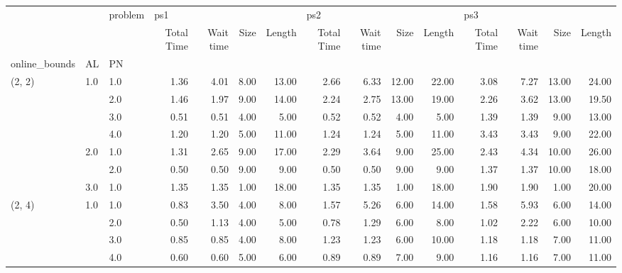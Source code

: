\begin{tabular}{lllrrrrrrrrrrrr}
\toprule
       &     & problem & \multicolumn{4}{l}{ps1} & \multicolumn{4}{l}{ps2} & \multicolumn{4}{l}{ps3} \\
       &     & {} & Total Time & Wait time & Size & Length & Total Time & Wait time &  Size & Length & Total Time & Wait time &  Size & Length \\
online\_bounds & AL & PN &            &           &      &        &            &           &       &        &            &           &       &        \\
\midrule
(2, 2) & 1.0 & 1.0  &       1.36 &      4.01 & 8.00 &  13.00 &       2.66 &      6.33 & 12.00 &  22.00 &       3.08 &      7.27 & 13.00 &  24.00 \\
       &     & 2.0  &       1.46 &      1.97 & 9.00 &  14.00 &       2.24 &      2.75 & 13.00 &  19.00 &       2.26 &      3.62 & 13.00 &  19.50 \\
       &     & 3.0  &       0.51 &      0.51 & 4.00 &   5.00 &       0.52 &      0.52 &  4.00 &   5.00 &       1.39 &      1.39 &  9.00 &  13.00 \\
       &     & 4.0  &       1.20 &      1.20 & 5.00 &  11.00 &       1.24 &      1.24 &  5.00 &  11.00 &       3.43 &      3.43 &  9.00 &  22.00 \\
       & 2.0 & 1.0  &       1.31 &      2.65 & 9.00 &  17.00 &       2.29 &      3.64 &  9.00 &  25.00 &       2.43 &      4.34 & 10.00 &  26.00 \\
       &     & 2.0  &       0.50 &      0.50 & 9.00 &   9.00 &       0.50 &      0.50 &  9.00 &   9.00 &       1.37 &      1.37 & 10.00 &  18.00 \\
       & 3.0 & 1.0  &       1.35 &      1.35 & 1.00 &  18.00 &       1.35 &      1.35 &  1.00 &  18.00 &       1.90 &      1.90 &  1.00 &  20.00 \\
(2, 4) & 1.0 & 1.0  &       0.83 &      3.50 & 4.00 &   8.00 &       1.57 &      5.26 &  6.00 &  14.00 &       1.58 &      5.93 &  6.00 &  14.00 \\
       &     & 2.0  &       0.50 &      1.13 & 4.00 &   5.00 &       0.78 &      1.29 &  6.00 &   8.00 &       1.02 &      2.22 &  6.00 &  10.00 \\
       &     & 3.0  &       0.85 &      0.85 & 4.00 &   8.00 &       1.23 &      1.23 &  6.00 &  10.00 &       1.18 &      1.18 &  7.00 &  11.00 \\
       &     & 4.0  &       0.60 &      0.60 & 5.00 &   6.00 &       0.89 &      0.89 &  7.00 &   9.00 &       1.16 &      1.16 &  7.00 &  11.00 \\

\end{tabular}
